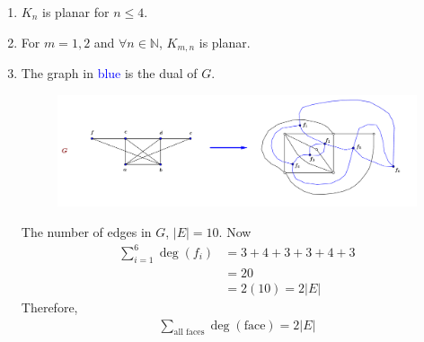 \documentclass[paper=a4, fontsize=11pt,twoside]{scrartcl}		%
\theoremstyle{definition}
\theoremstyle{remark}
\begin{document}
\begin{enumerate}
  \item $K_n$ is planar for $n\leq4$.
  \item For $m=1,2$ and $\forall n\in \mathbb{N}$, $K_{m,n}$ is planar.
  \item The graph in \textcolor{blue}{blue} is the dual of $G$.

  \begin{figure}[hbt!]
\centering
\includegraphics[width=1.0\textwidth]{Soldual.png}
\end{figure}

  The number of edges in $G$, $|E|=10$. Now
  \begin{align*}
  \sum_{i=1}^{6}\deg(f_i)&=3+4+3+3+4+3\\
                         &=20\\
                         &=2(10)=2|E|
  \end{align*}
  Therefore,
  \begin{align*}
  \sum_{\text{all faces}}\deg(\text{face})=2|E|
  \end{align*}
\end{enumerate}
\end{document}
